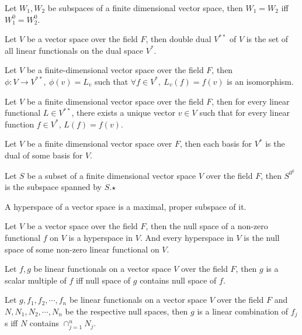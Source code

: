 	\begin{corollary}
		Let $W_1, W_2$ be subspaces of a finite dimensional vector space, then $W_1 = W_2$ iff $W_1^0 = W_2^0$.
	\end{corollary}
	\begin{definition}
		Let $V$ be a vector space over the field $F$, then double dual $V^{**}$ of $V$ is the set of all linear functionals on the dual space $V^*$.
	\end{definition}
	\begin{theorem}
		Let $V$ be a finite-dimensional vector space over the field $F$, then $\phi : V \to V^{**},\ \phi(v) = L_v$ such that $\forall f \in V^*,\ L_v(f) = f(v)$ is an isomorphism.
	\end{theorem}
	\begin{corollary}
		Let $V$ be a finite dimensional vector space over the field $F$, then for every linear functional $L \in V^{**}$, there exists a unique vector $v \in V$ such that for every linear function $f \in V^*$, $L(f) = f(v)$.
	\end{corollary}
	\begin{corollary}
		Let $V$ be a finite dimensional vector space over $F$, then each basis for $V^*$ is the dual of some basis for $V$.
	\end{corollary}
	\begin{theorem}
		Let $S$ be a subset of a finite dimensional vector space $V$ over the field $F$, then $S^{0^0}$ is the subspace spanned by $S$.$\star$
	\end{theorem}
	\begin{definition}
		A hyperspace of a vector space is a maximal, proper subspace of it.
	\end{definition}
	\begin{theorem}
		Let $V$ be a vector space over the field $F$, then the null space of a non-zero functional $f$ on $V$ is a hyperspace in $V$. And every hyperspace in $V$ is the null space of some non-zero linear functional on $V$.
	\end{theorem}
	\begin{lemma}
		Let $f,g$ be linear functionals on a vector space $V$ over the field $F$, then $g$ is a scalar multiple of $f$ iff null space of $g$ contains null space of $f$.
	\end{lemma}
	\begin{theorem}
		Let $g, f_1, f_2, \cdots, f_n$ be linear functionals on a vector space $V$ over the field $F$ and $N, N_1, N_2, \cdots, N_n$ be the respective null spaces, then $g$ is a linear combination of $f_j$s iff $N$ contains $\cap_{j=1}^n N_j$.
	\end{theorem}
